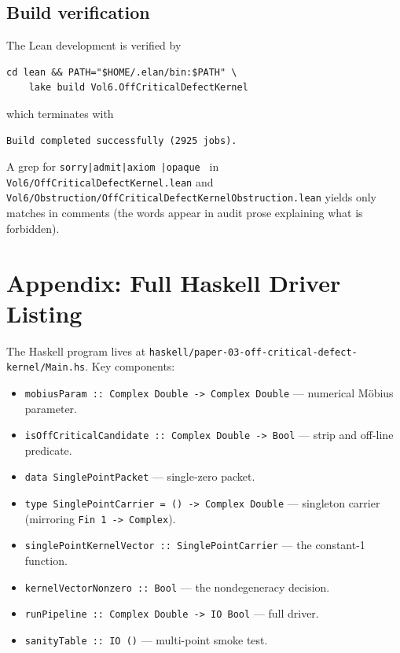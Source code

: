 \documentclass[12pt]{article}
\theoremstyle{definition}
\theoremstyle{remark}
\begin{document}
\subsection{Build verification}

The Lean development is verified by
\begin{verbatim}
cd lean && PATH="$HOME/.elan/bin:$PATH" \
    lake build Vol6.OffCriticalDefectKernel
\end{verbatim}
which terminates with
\begin{verbatim}
Build completed successfully (2925 jobs).
\end{verbatim}
A grep for \texttt{sorry|admit|axiom |opaque } in
\texttt{Vol6/OffCriticalDefectKernel.lean} and
\texttt{Vol6/Obstruction/OffCriticalDefectKernelObstruction.lean}
yields only matches in comments (the words appear in audit prose
explaining what is forbidden).

\section{Appendix: Full Haskell Driver Listing}\label{sec:haskell-listing}

The Haskell program lives at
\texttt{haskell/paper-03-off-critical-defect-kernel/Main.hs}. Key
components:

\begin{itemize}
\item \texttt{mobiusParam :: Complex Double -> Complex Double} —
   numerical Möbius parameter.
\item \texttt{isOffCriticalCandidate :: Complex Double -> Bool}
   — strip and off-line predicate.
\item \texttt{data SinglePointPacket} — single-zero packet.
\item \texttt{type SinglePointCarrier = () -> Complex Double} — singleton
   carrier (mirroring \texttt{Fin 1 -> Complex}).
\item \texttt{singlePointKernelVector :: SinglePointCarrier} — the
   constant-1 function.
\item \texttt{kernelVectorNonzero :: Bool} — the nondegeneracy decision.
\item \texttt{runPipeline :: Complex Double -> IO Bool} — full driver.
\item \texttt{sanityTable :: IO ()} — multi-point smoke test.
\end{itemize}
\end{document}

